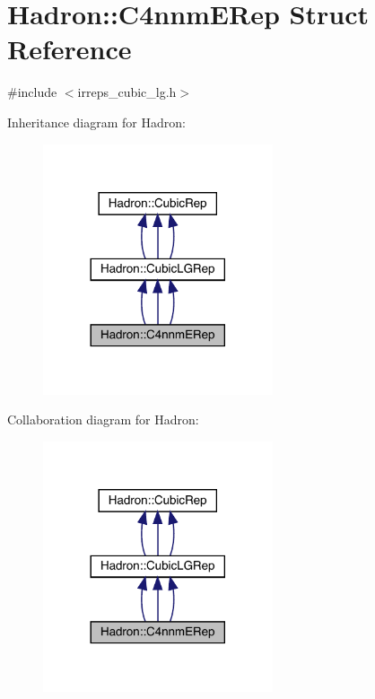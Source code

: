 \hypertarget{structHadron_1_1C4nnmERep}{}\section{Hadron\+:\+:C4nnm\+E\+Rep Struct Reference}
\label{structHadron_1_1C4nnmERep}


{\ttfamily \#include $<$irreps\+\_\+cubic\+\_\+lg.\+h$>$}



Inheritance diagram for Hadron\+:
\nopagebreak
\begin{figure}[H]
\begin{center}
\leavevmode
\includegraphics[width=192pt]{db/dd4/structHadron_1_1C4nnmERep__inherit__graph}
\end{center}
\end{figure}


Collaboration diagram for Hadron\+:
\nopagebreak
\begin{figure}[H]
\begin{center}
\leavevmode
\includegraphics[width=192pt]{d0/db5/structHadron_1_1C4nnmERep__coll__graph}
\end{center}
\end{figure}
